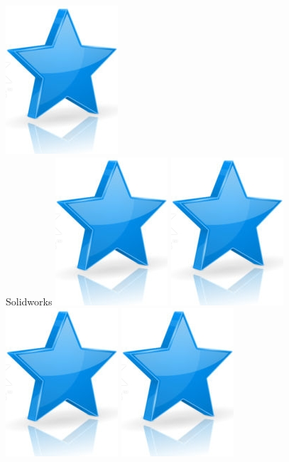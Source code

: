 \documentclass[10pt,a4paper,sans]{article}
\begin{document}
\begin{minipage}{0.23\textwidth}
    \includegraphics[scale=0.25]{img/star.png}\\
    Solidworks
    \includegraphics[scale=0.25]{img/star.png}
    \includegraphics[scale=0.25]{img/star.png}
    \includegraphics[scale=0.25]{img/star.png}
    \includegraphics[scale=0.25]{img/star.png}

\end{minipage}
\end{document}
